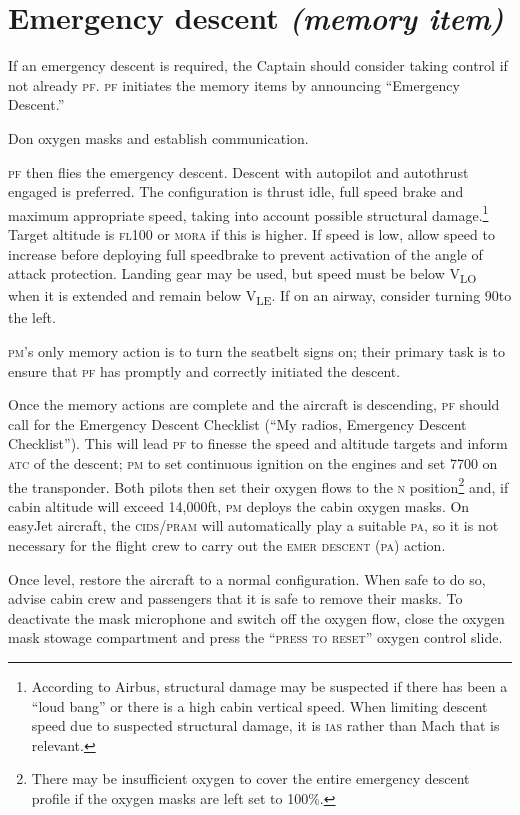 \documentclass[a5paper,11pt,twoside]{book}
\newcommand{\ac}[1]{{\scshape\MakeLowercase{#1}}}
\newcommand{\ecam}[2]{{\ac{\uline{#1} #2}}}
\newcommand{\cphrase}[1]{\ac{#1}}
\newcommand{\V}[1]{V\textsubscript{#1}}
\begin{document}
\section{Emergency descent \emph{(memory item)}}

If an emergency descent is required, the Captain should consider taking control
if not already \ac{PF}. \ac{PF} initiates the memory items by announcing
``Emergency Descent.''

Don oxygen masks and establish communication.

\ac{PF} then flies the emergency descent.  Descent with autopilot and autothrust
engaged is preferred. The configuration is thrust idle, full speed brake and
maximum appropriate speed, taking into account possible structural
damage.\footnote{According to Airbus, structural damage may be suspected if
there has been a ``loud bang'' or there is a high cabin vertical speed. When
limiting descent speed due to suspected structural damage, it is \ac{IAS} rather
than Mach that is relevant.} Target altitude is \ac{FL100} or \ac{MORA} if this
is higher. If speed is low, allow speed to increase before deploying full
speedbrake to prevent activation of the angle of attack protection. Landing gear
may be used, but speed must be below \V{LO} when it is extended and remain below
\V{LE}. If on an airway, consider turning 90\textdegree{ }to the left.

\ac{PM}'s only memory action is to turn the seatbelt signs on; their primary
task is to ensure that \ac{PF} has promptly and correctly initiated the descent.

Once the memory actions are complete and the aircraft is descending, \ac{PF}
should call for the Emergency Descent Checklist (``My radios, Emergency Descent
Checklist''). This will lead \ac{PF} to finesse the speed and altitude targets and
inform \ac{ATC} of the descent; \ac{PM} to set continuous ignition on the engines and set
7700 on the transponder. Both pilots then set their oxygen flows to the \ac{N}
position\footnote{There may be insufficient oxygen to cover the entire emergency
descent profile if the oxygen masks are left set to 100\%.} and, if cabin
altitude will exceed 14,000ft, \ac{PM} deploys the cabin oxygen masks. On easyJet
aircraft, the \ac{CIDS}/\ac{PRAM} will automatically play a suitable \ac{PA}, so it is not
necessary for the flight crew to carry out the \ecam{}{EMER DESCENT (PA)} action.

Once level, restore the aircraft to a normal configuration. When safe to do so,
advise cabin crew and passengers that it is safe to remove their masks. To
deactivate the mask microphone and switch off the oxygen flow, close the oxygen
mask stowage compartment and press the ``\cphrase{PRESS TO RESET}'' oxygen control slide.
\end{document}
